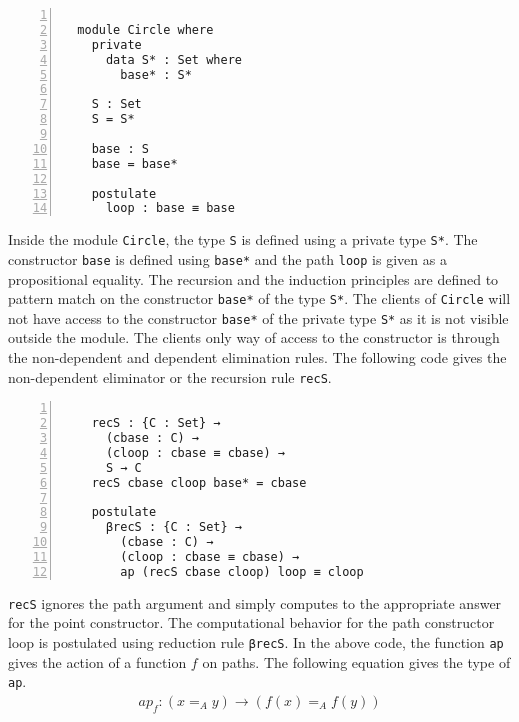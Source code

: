 \documentclass[sigplan,10pt]{acmart}
\begin{document}
\begin{center}
\begingroup
\fontsize{7pt}{9pt}\selectfont
\begin{Verbatim}[frame = lines, rulecolor=\color{blue}, numbers = left, numbersep = 0pt]

  module Circle where
    private
      data S* : Set where
        base* : S*

    S : Set
    S = S*

    base : S
    base = base*
	   
    postulate
      loop : base ≡ base

\end{Verbatim}
\endgroup
\end{center}

\normalsize

Inside the module {\tt Circle}, the type {\tt S} is defined using a private type {\tt S*}. The constructor {\tt base} is defined using {\tt base*} and the path {\tt loop} is given as a propositional equality. The recursion and the induction principles are defined to pattern match on the constructor {\tt base*} of the type {\tt S*}. The clients of {\tt Circle} will not have access to the constructor {\tt base*} of the private type {\tt S*} as it is not visible outside the module. The clients only way of access to the constructor is through the non-dependent and dependent elimination rules. The following code gives the non-dependent eliminator or the recursion rule {\tt recS}. 

\begin{center}
\begingroup
\fontsize{7pt}{9pt}\selectfont
\begin{Verbatim}[frame = lines, rulecolor=\color{blue}, numbers = left, numbersep = 0pt]

    recS : {C : Set} → 
      (cbase : C) → 
      (cloop : cbase ≡ cbase) → 
      S → C
    recS cbase cloop base* = cbase

    postulate
      βrecS : {C : Set} → 
        (cbase : C) → 
        (cloop : cbase ≡ cbase) → 
        ap (recS cbase cloop) loop ≡ cloop

\end{Verbatim}
\endgroup
\end{center}

\normalsize
 
{\tt recS} ignores the path argument and simply computes to the appropriate answer for the point constructor. The computational behavior for the path constructor loop is postulated using reduction rule {\tt βrecS}. In the above code, the function {\tt ap} gives the action of a function $f$ on paths. The following equation gives the type of {\tt ap}. 
\begin{align} \label{eq:ap}
ap_f : (x =_A y) \rightarrow (f(x) =_A f(y))
\end{align}
\end{document}
